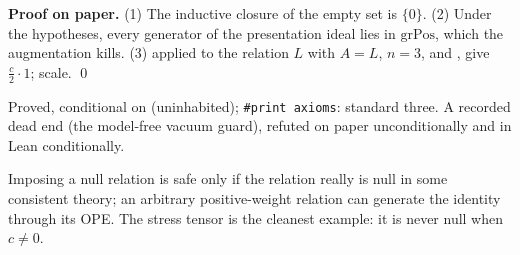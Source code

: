 \textbf{Proof on paper.} (1) The inductive closure of the empty set is $\{0\}$. (2) Under the hypotheses, every generator of the
presentation ideal lies in $\mathrm{grPos}$, which the augmentation kills. (3)  applied to the relation $L$ with $A = L$,
$n=3$, and , give $\frac c2\cdot1$; scale. \qed

\begin{status}
Proved, conditional on  (uninhabited); \texttt{\#print axioms}: standard three. A recorded dead end (the
model-free vacuum guard), refuted on paper unconditionally and in Lean conditionally.
\end{status}

\begin{physics}
Imposing a null relation is safe only if the relation really is null in some consistent theory; an arbitrary positive-weight
relation can generate the identity through its OPE. The stress tensor is the cleanest example: it is never null when $c\neq0$.
\end{physics}

